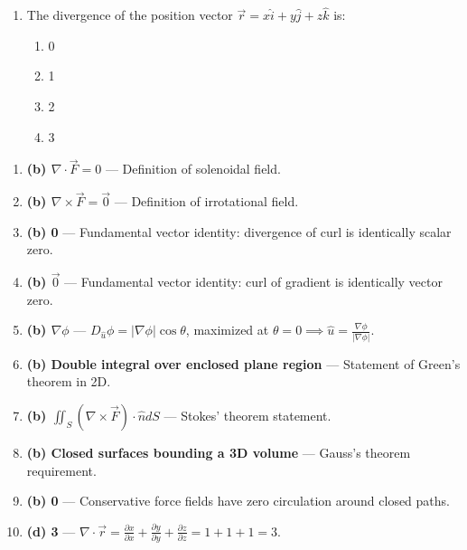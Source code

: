 \begin{enumerate}[leftmargin=1.5em]
    \item The divergence of the position vector $\vec{r} = x\hat{i} + y\hat{j} + z\hat{k}$ is:
    \begin{enumerate}[label=(\alph*)]
        \item 0
        \item 1
        \item 2
        \item 3
    \end{enumerate}
\end{enumerate}

\begin{solutionbox}
\begin{enumerate}
    \item \textbf{(b) $\nabla\cdot\vec{F} = 0$} --- Definition of solenoidal field.
    \item \textbf{(b) $\nabla\times\vec{F} = \vec{0}$} --- Definition of irrotational field.
    \item \textbf{(b) 0} --- Fundamental vector identity: divergence of curl is identically scalar zero.
    \item \textbf{(b) $\vec{0}$} --- Fundamental vector identity: curl of gradient is identically vector zero.
    \item \textbf{(b) $\nabla\phi$} --- $D_{\hat{u}}\phi = |\nabla\phi|\cos\theta$, maximized at $\theta = 0 \implies \hat{u} = \frac{\nabla\phi}{|\nabla\phi|}$.
    \item \textbf{(b) Double integral over enclosed plane region} --- Statement of Green's theorem in 2D.
    \item \textbf{(b) $\iint_S (\nabla\times\vec{F})\cdot\hat{n} dS$} --- Stokes' theorem statement.
    \item \textbf{(b) Closed surfaces bounding a 3D volume} --- Gauss's theorem requirement.
    \item \textbf{(b) 0} --- Conservative force fields have zero circulation around closed paths.
    \item \textbf{(d) 3} --- $\nabla\cdot\vec{r} = \frac{\partial x}{\partial x} + \frac{\partial y}{\partial y} + \frac{\partial z}{\partial z} = 1 + 1 + 1 = 3$.
\end{enumerate}
\end{solutionbox}

